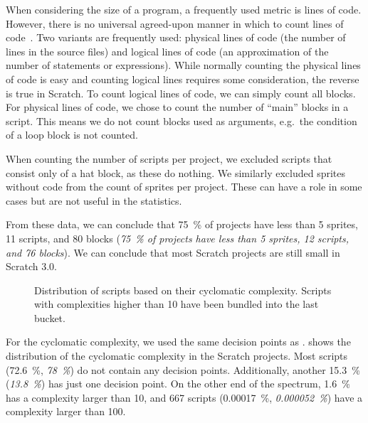 \documentclass[../main]{subfiles}
\begin{document}
When considering the size of a program, a frequently used metric is lines of code.
However, there is no universal agreed-upon manner in which to count lines of code~\autocite{nguyenSLOCCountingStandard2007}.
Two variants are frequently used: physical lines of code (the number of lines in the source files) and logical lines of code (an approximation of the number of statements or expressions).
While normally counting the physical lines of code is easy and counting logical lines requires some consideration, the reverse is true in Scratch.
To count logical lines of code, we can simply count all blocks.
For physical lines of code, we chose to count the number of ``main'' blocks in a script.
This means we do not count blocks used as arguments, e.g.\ the condition of a loop block is not counted.

When counting the number of scripts per project, we excluded scripts that consist only of a hat block, as these do nothing.
We similarly excluded sprites without code from the count of sprites per project.
These can have a role in some cases but are not useful in the statistics.

From these data, we can conclude that \qty{75}{\percent} of projects have less than 5 sprites, 11 scripts, and 80 blocks (\textit{\qty{75}{\percent} of projects have less than 5 sprites, 12 scripts, and 76 blocks}).
We can conclude that most Scratch projects are still small in Scratch 3.0.

\begin{figure}
    \begin{wide}
        
    \end{wide}
    \caption{
        Distribution of scripts based on their cyclomatic complexity.
        Scripts with complexities higher than 10 have been bundled into the last bucket.
    }
    \label{fig:scratch-cc}
\end{figure}

For the cyclomatic complexity, we used the same decision points as \citeauthor{aivaloglouHowKidsCode2016}.
 shows the distribution of the cyclomatic complexity in the Scratch projects.
Most scripts (\qty{72.6}{\percent}, \textit{\qty{78}{\percent}}) do not contain any decision points.
Additionally, another \qty{15.3}{\percent} (\textit{\qty{13.8}{\percent}}) has just one decision point.
On the other end of the spectrum, \qty{1.6}{\percent} has a complexity larger than 10, and 667 scripts (\qty{0.00017}{\percent}, \textit{\qty{0.000052}{\percent}}) have a complexity larger than 100.
\end{document}
